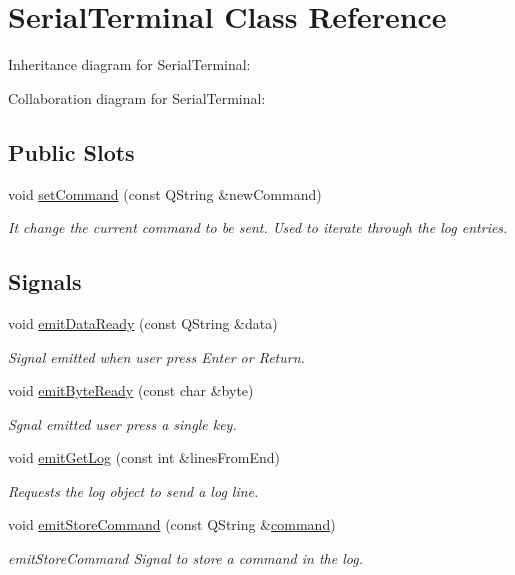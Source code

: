 \hypertarget{classSerialTerminal}{}\section{Serial\+Terminal Class Reference}
\label{classSerialTerminal}


Inheritance diagram for Serial\+Terminal\+:


Collaboration diagram for Serial\+Terminal\+:
\subsection*{Public Slots}
\begin{DoxyCompactItemize}
\item 
void \hyperlink{classSerialTerminal_a0bec3c5cd061b502ce104e7add993510}{set\+Command} (const Q\+String \&new\+Command)
\begin{DoxyCompactList}\small\item\em It change the current command to be sent. Used to iterate through the log entries. \end{DoxyCompactList}\end{DoxyCompactItemize}
\subsection*{Signals}
\begin{DoxyCompactItemize}
\item 
void \hyperlink{classSerialTerminal_a53f49282e28fb496fc77fcd8362e1298}{emit\+Data\+Ready} (const Q\+String \&data)
\begin{DoxyCompactList}\small\item\em Signal emitted when user press Enter or Return. \end{DoxyCompactList}\item 
void \hyperlink{classSerialTerminal_a2307f483e520204281ab5a0bbb262651}{emit\+Byte\+Ready} (const char \&byte)
\begin{DoxyCompactList}\small\item\em Sgnal emitted user press a single key. \end{DoxyCompactList}\item 
void \hyperlink{classSerialTerminal_a2676d7377ffa113b1f3431cdf1cde904}{emit\+Get\+Log} (const int \&lines\+From\+End)
\begin{DoxyCompactList}\small\item\em Requests the log object to send a log line. \end{DoxyCompactList}\item 
void \hyperlink{classSerialTerminal_a8c8fbd2c39d1c6870560abf2808f040e}{emit\+Store\+Command} (const Q\+String \&\hyperlink{classSerialTerminal_a4f76b31e778ed594dc6395909076f33d}{command})
\begin{DoxyCompactList}\small\item\em emit\+Store\+Command Signal to store a command in the log. \end{DoxyCompactList}\end{DoxyCompactItemize}
